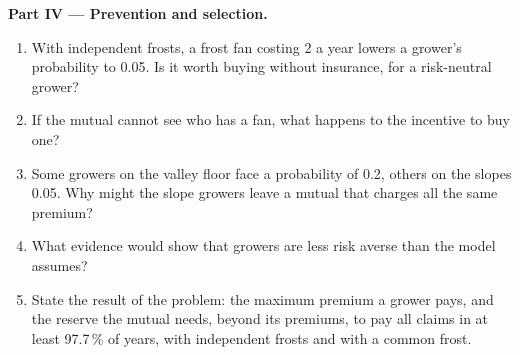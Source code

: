 \begin{problem}
\medskip
\noindent\textbf{Part IV --- Prevention and selection.}
\begin{enumerate}[resume]
\item With independent frosts, a frost fan costing 2 a year lowers a grower's probability to 0.05. Is it worth buying without insurance, for a risk-neutral grower?
\item If the mutual cannot see who has a fan, what happens to the incentive to buy one?
\item Some growers on the valley floor face a probability of 0.2, others on the slopes 0.05. Why might the slope growers leave a mutual that charges all the same premium?
\item What evidence would show that growers are less risk averse than the model assumes?
\item State the result of the problem: the maximum premium a grower pays, and the reserve the mutual needs, beyond its premiums, to pay all claims in at least 97.7\,\% of years,
  with independent frosts and with a common frost.
\end{enumerate}
\end{problem}
